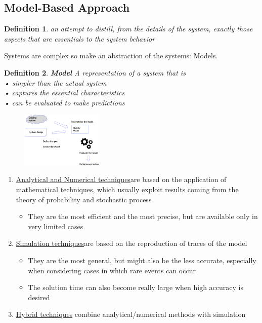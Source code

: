 \documentclass[10pt, oneside]{article}
\newtheorem{defn}{Definition}
\begin{document}
\subsection{Model-Based Approach}
\begin{defn}
    an attempt to distill, from the details of the system, exactly those aspects that are essentials to the system behavior
\end{defn}
\begin{multicols}{2}
    Systems are complex so make an abstraction of the systems: Models.
\begin{defn}
    {\bf Model} A representation of a system that is\\
    • simpler than the actual system\\
    • captures the essential characteristics\\
    • can be evaluated to make predictions
\end{defn}
\columnbreak
\begin{figure}[H]
    \begin{center}
    \includegraphics[width=0.35\textwidth]{img/img93.png}
    \end{center}
\end{figure}
\end{multicols}
\begin{enumerate}
    \item \underline{Analytical and Numerical techniques}are based on the application of mathematical techniques, which usually exploit results coming from the theory of probability and stochastic process\begin{itemize}
        \item They are the most efficient and the most precise, but are available only in very limited cases
    \end{itemize}
    \item \underline{Simulation techniques}are based on the reproduction of traces of the model\begin{itemize}
        \item They are the most general, but might also be the less accurate, especially when considering cases in which rare events can occur
        \item The solution time can also become really large when high accuracy is desired
    \end{itemize}
    \item \underline{Hybrid techniques} combine analytical/numerical methods with simulation
\end{enumerate}
\end{document}
